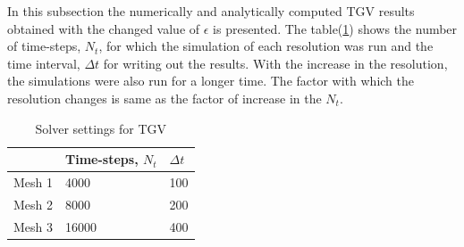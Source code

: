 In this subsection the numerically and analytically computed TGV results obtained with the changed value of $\epsilon$ is presented. The table(\ref{solver TGV}) shows the number of time-steps, $N_t$, for which the simulation of each resolution was run and the time interval, $\Delta t$ for writing out the results. With the increase in the resolution, the simulations were also run for a longer time. The factor with which the resolution changes is same as the factor of increase in the $N_t$.

%
\begin{table}[h!]
\begin{center}
\begin{tabular}{ p{1.5cm}|p{2.5cm}|p{1cm}} 

 & Time-steps, $N_t$ & $\Delta t$\\
  \hline
   Mesh 1& 4000 & 100\\
  \hline
  Mesh 2& 8000& 200\\
  \hline
  Mesh 3 & 16000 & 400\\
  \hline
\end{tabular}
\end{center}
\caption{Solver settings for TGV}
\label{solver TGV}
\end{table}
%


